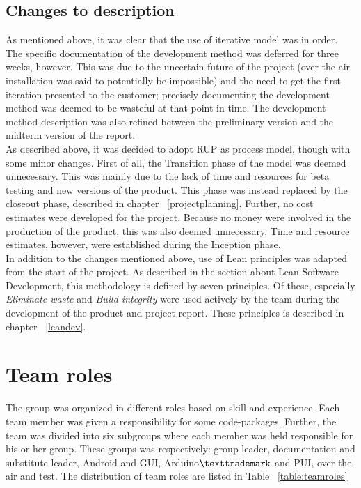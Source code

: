 \subsection{Changes to description} 
As mentioned above, it was clear that the use of iterative model was in order. The specific documentation of the development method was deferred for three weeks, however. This was due to the uncertain future of the project (over the air installation was said to potentially be impossible) and the need to get the first iteration presented to the customer; precisely documenting the development method was deemed to be wasteful at that point in time. The development method description was also refined between the preliminary version and the midterm version of the report. \\
\newline
As described above, it was decided to adopt RUP as process model, though with some minor changes. First of all, the Transition phase of the model was deemed unnecessary. This was mainly due to the lack of time and resources for beta testing and new versions of the product. This phase was instead replaced by the closeout phase, described in chapter ~\ref{projectplanning}. Further, no cost estimates were developed for the project. Because no money were involved in the production of the product, this was also deemed unnecessary. Time and resource estimates, however, were established during the Inception phase. \\
\newline
In addition to the changes mentioned above, use of Lean principles was adapted from the start of the project. As described in the section about Lean Software Development, this methodology is defined by seven principles. Of these, especially \emph{Eliminate waste} and \emph{Build integrity} were used actively by the team during the development of the product and project report. These principles is described in chapter ~\ref{leandev}.

\section{Team roles}
The group was organized in different roles based on skill and experience. Each team member was given a responsibility for some code-packages. Further, the team was divided into six subgroups where each member was held responsible for his or her group. These groups was respectively: group leader, documentation and substitute leader, Android and GUI, Arduino$\texttrademark$ and PUI, over the air and test.
The distribution of team roles are listed in Table ~\ref{table:teamroles}

